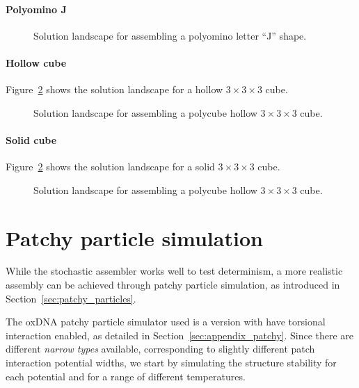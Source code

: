 \paragraph{Polyomino J}

\begin{figure}[h]
    \caption{Solution landscape for assembling a polyomino letter ``J'' shape.}
    \label{fig:letter_J}
\end{figure}

\paragraph{Hollow cube} Figure~\ref{fig:hollow_cube} shows the solution landscape for a hollow \(3 \times 3 \times 3\) cube.

\begin{figure}[h]
    \centering
    \caption{Solution landscape for assembling a polycube hollow \(3 \times 3 \times 3\) cube.}
    \label{fig:hollow_cube}
\end{figure}

\paragraph{Solid cube} Figure~\ref{fig:hollow_cube} shows the solution landscape for a solid \(3 \times 3 \times 3\) cube.

\begin{figure}[h]
    \caption{Solution landscape for assembling a polycube hollow \(3 \times 3 \times 3\) cube.}
    \label{fig:solid_cube}
\end{figure}


\section{Patchy particle simulation}
While the stochastic assembler works well to test determinism, a more realistic assembly can be achieved through patchy particle simulation, as introduced in Section~\ref{sec:patchy_particles}.

The oxDNA patchy particle simulator used is a version with have torsional interaction enabled, as detailed in Section~\ref{sec:appendix_patchy}. Since there are different \emph{narrow types} available, corresponding to slightly different patch interaction potential widths, we start by simulating the structure stability for each potential and for a range of different temperatures.




